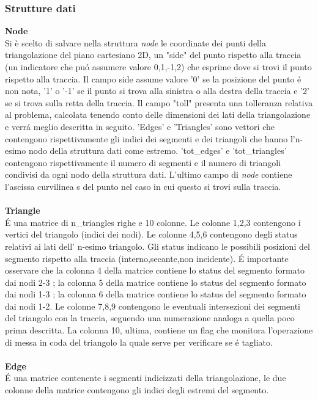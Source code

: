 \documentclass[11pt, a4paper]{article}
\begin{document}
\subsubsection{\textbf{Strutture dati}}
\textbf{Node}\\
Si \`e scelto di salvare nella struttura \textit{node} le coordinate dei punti della triangolazione del piano cartesiano 2D, un "side" del punto rispetto alla traccia (un indicatore che pu\'o assumere valore 0,1,-1,2) che esprime dove si trovi il punto rispetto alla traccia. Il campo side assume valore '0' se la posizione del punto \'e non nota, '1' o '-1' se il punto si trova alla sinistra o alla destra della traccia e '2' se si trova sulla retta della traccia. Il campo "toll" presenta una tolleranza relativa al problema, calcolata tenendo conto delle dimensioni dei lati della triangolazione e verr\'a meglio descritta in seguito. 'Edges' e 'Triangles' sono vettori che contengono rispettivamente gli indici dei segmenti e dei triangoli che hanno l'n-esimo nodo della struttura dati come estremo. 'tot\_edges' e 'tot\_triangles' contengono rispettivamente il numero di segmenti e il numero di triangoli condivisi da ogni nodo della struttura dati. L'ultimo campo di \textit{node} contiene l'ascissa curvilinea s del punto nel caso in cui questo si trovi sulla traccia.\\\\
\textbf{Triangle}\\
 \'E una matrice di {n\_triangles} righe e 10 colonne. Le colonne 1,2,3 contengono i vertici del triangolo (indici dei nodi). Le colonne 4,5,6 contengono degli status relativi ai lati dell' n-esimo triangolo. Gli status indicano le possibili posizioni del segmento rispetto alla traccia (interno,secante,non incidente). \'E importante osservare che la colonna 4 della matrice contiene lo status del segmento formato dai nodi 2-3 ; la colonna 5 della matrice contiene lo status del segmento formato dai nodi 1-3 ; la colonna 6 della matrice contiene lo status del segmento formato dai nodi 1-2. Le colonne 7,8,9 contengono le eventuali intersezioni dei segmenti del triangolo con la traccia, seguendo una numerazione analoga a quella poco prima descritta. La colonna 10, ultima, contiene un flag che monitora l'operazione di messa in coda del triangolo la quale serve per verificare se \'e tagliato.\\\\
\textbf{Edge}\\
\'E una matrice contenente i segmenti indicizzati della triangolazione, le due colonne della matrice contengono gli indici degli estremi del segmento.\\\\
\end{document}
